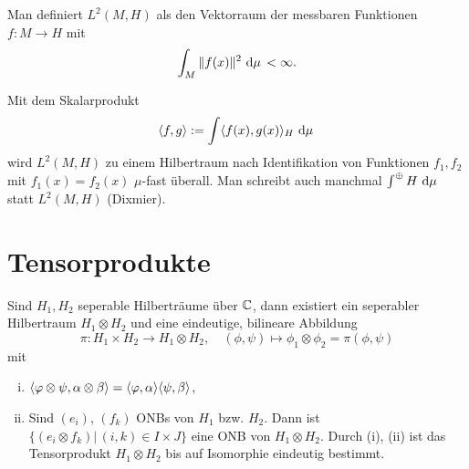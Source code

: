 \documentclass{mycourse}
\begin{document}
Man definiert $L^2(M, H)$ als den Vektorraum der messbaren Funktionen $f: M \to H$ mit 
\[
\int_M \| f(x)\|^2 \, \dx[\mu] <\infty.
\]

Mit dem Skalarprodukt
\[
\< f,g\> := \int \< f(x), g(x) \>_H \, \dx[\mu]
\]
wird $L^2(M,H)$ zu einem Hilbertraum nach Identifikation von Funktionen $f_1,f_2$ mit $f_1(x)=f_2(x)$ $\mu$-fast überall. Man schreibt auch manchmal $\int ^\oplus H \, \dx[\mu]$ statt $L^2(M, H)$ (Dixmier).

\section{Tensorprodukte}
\begin{st}\label{8.3}
Sind $H_1, H_2$ seperable Hilberträume über $\C$, dann existiert ein seperabler Hilbertraum $H_1 \otimes H_2$ und eine eindeutige, bilineare Abbildung 
\[
\pi: H_1 \times H_2 \to H_1 \otimes H_2, \quad (\phi, \psi) \mapsto \phi_1 \otimes \phi_2 = \pi(\phi, \psi)
\]
mit
\begin{enumerate}[(i)]
\item $\<\phi \otimes \psi, \alpha \otimes \beta\> = \< \phi, \alpha\> \< \psi, \beta\> $,
\item Sind $(e_i)$, $(f_k)$ ONBs von $H_1$ bzw. $H_2$. Dann ist $\{(e_i \otimes f_k) |\, (i,k) \in I\times J\}$ eine ONB von $H_1 \otimes H_2$. Durch (i), (ii) ist das Tensorprodukt $H_1 \otimes H_2$ bis auf Isomorphie eindeutig bestimmt.
\end{enumerate}
\end{st}
\end{document}
